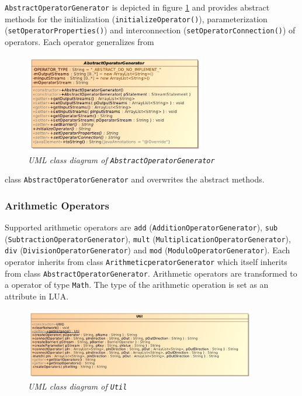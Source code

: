 \texttt{AbstractOperatorGenerator} is depicted in figure 
\ref{fig:abstractoperatorgenerator} and provides abstract methods for the 
initialization (\texttt{initializeOperator()}), parameterization 
(\texttt{setOperatorProperties()}) and interconnection 
(\texttt{setOperatorConnection()}) of operators. Each operator generalizes from
\begin{figure}[htpb]
  \centering
  \includegraphics[width=0.7\textwidth]{figures/AbstractOperatorGenerator}
  \caption{\emph{UML class diagram of \texttt{AbstractOperatorGenerator}}}
  \label{fig:abstractoperatorgenerator}
\end{figure}
class \texttt{AbstractOperatorGenerator} and overwrites the abstract methods.

\subsubsection{Arithmetic Operators}
Supported arithmetic operators are \texttt{add} 
(\texttt{AdditionOperatorGenerator}), \texttt{sub} 
(\texttt{Subtraction\-OperatorGenerator}), \texttt{mult} 
(\texttt{MultiplicationOperatorGenerator}), \texttt{div} 
(\texttt{DivisionOperator\-Generator}) and \texttt{mod} 
(\texttt{ModuloOperatorGenerator}). Each operator inherits from class 
\texttt{Arithm\-eticperatorGenerator} which itself inherits from class
\texttt{AbstractOperatorGenerator}. Arithmetic operators are transformed to a
operator of type \texttt{Math}. The type of the arithmetic operation is set
as an attribute in LUA.

\begin{figure}[htpb]
  \centering
  \includegraphics[width=0.9\textwidth]{figures/Util}
  \caption{\emph{UML class diagram of \texttt{Util}}}
  \label{fig:util}
\end{figure}

